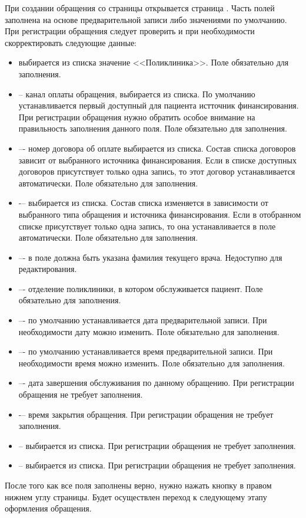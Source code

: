 При создании обращения со страницы  открывается страница . Часть полей заполнена на основе  предварительной записи либо значениями по умолчанию. При регистрации обращения следует проверить и при необходимости скорректировать следующие данные:

\begin{itemize}
	\item {} выбирается из списка значение <<Поликлиника>>. Поле обязательно для заполнения.
	\item {} – канал оплаты обращения, выбирается из списка. По умолчанию устанавливается первый доступный для пациента истточник финансирования. При регистрации обращения нужно обратить особое внимание на правильность заполнения данного поля. Поле обязательно для заполнения.
	\item {} –- номер договора об оплате выбирается из списка. Состав списка договоров зависит от выбранного источника финансирования. Если в списке доступных договоров присутствует только одна запись, то этот договор устанавливается автоматически. Поле обязательно для заполнения.
	\item {} -– выбирается из списка. Состав списка изменяется в зависимости от выбранного типа обращения и источника финансирования. Если в отобранном списке присутствует только одна запись, то она устанавливается в поле автоматически. Поле обязательно для заполнения.
	\item {} –- в поле должна быть указана фамилия текущего врача. Недоступно для редактирования.
	\item {} –- отделение поликлиники, в котором обслуживается пациент. Поле обязательно для заполнения.
	\item {} –- по умолчанию устанавливается дата предварительной записи. При необходимости дату можно изменить. Поле обязательно для заполнения.
	\item {} –- по умолчанию устанавливается время предварительной записи. При необходимости время можно изменить. Поле обязательно для заполнения.
	\item {} –- дата завершения обслуживания по данному обращению. При регистрации обращения не требует заполнения.
	\item {} -– время закрытия обращения. При регистрации обращения не требует заполнения.
	\item {} -- выбирается из списка. При регистрации обращения не требует заполнения.
	\item {} -- выбирается из списка. При регистрации обращения не требует заполнения.
\end{itemize}

После того как все поля заполнены верно, нужно нажать кнопку  в правом нижнем углу страницы. Будет осуществлен переход к следующему этапу оформления обращения.




